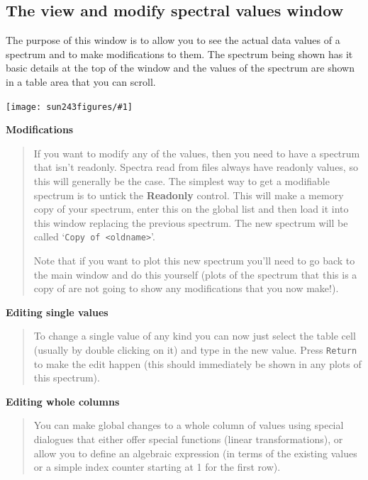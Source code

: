 \documentclass[twoside,11pt]{article}
\newcommand{\htmladdimg}[1]{}
\newcommand{\latexhtml}[2]{#1}
\renewcommand{\_}{\texttt{\symbol{95}}}
\newcommand{\mainfigure}[1]
{\begin{center}
 \latexhtml{\texttt{[image: sun243\_figures/\#1]}}{\htmladdimg{#1.gif}}
 \end{center}
}
\newcommand{\labelitem}[1]{\textbf{#1}}
\newcommand{\hitext}[1]{\texttt{#1}}
\newcommand{\subheading}[1]{\textbf{\large{#1}}}
\begin{document}
\newpage
\subsection{The view and modify spectral values window}

The purpose of this window is to allow you to see the actual data
values of a spectrum and to make modifications to them.
The spectrum being shown has it basic details at the top of the window
and the values of the spectrum are shown in a table area that you can
scroll.

\mainfigure{viewwindow}

\subheading{Modifications}
\begin{quote}
 If you want to modify any of the values, then you need to have a
 spectrum that isn't readonly. Spectra read from files always have
 readonly values, so this will generally be the case. The simplest way
 to get a modifiable spectrum is to untick the \labelitem{Readonly}
 control. This will make a memory copy of your spectrum, enter this on
 the global list and then load it into this window replacing the
 previous spectrum. The new spectrum will be called
 `\hitext{Copy of <oldname>}'.

 Note that if you want to plot this new spectrum you'll need to go back
 to the main window and do this yourself (plots of the spectrum that
 this is a copy of are not going to show any modifications that you now
 make!).
\end{quote}

\subheading{Editing single values}
\begin{quote}
 To change a single value of any kind you can now just select the
 table cell (usually by double clicking on it) and type in the new
 value. Press \hitext{Return} to make the edit happen (this should
 immediately be shown in any plots of this spectrum).
\end{quote}

\subheading{Editing whole columns}
\begin{quote}
 You can make global changes to a whole column of values using special
 dialogues that either offer special functions (linear transformations),
 or allow you to define an algebraic expression (in terms of the
 existing values or a simple index counter starting at 1 for the first
 row).
\end{quote}
\end{document}
